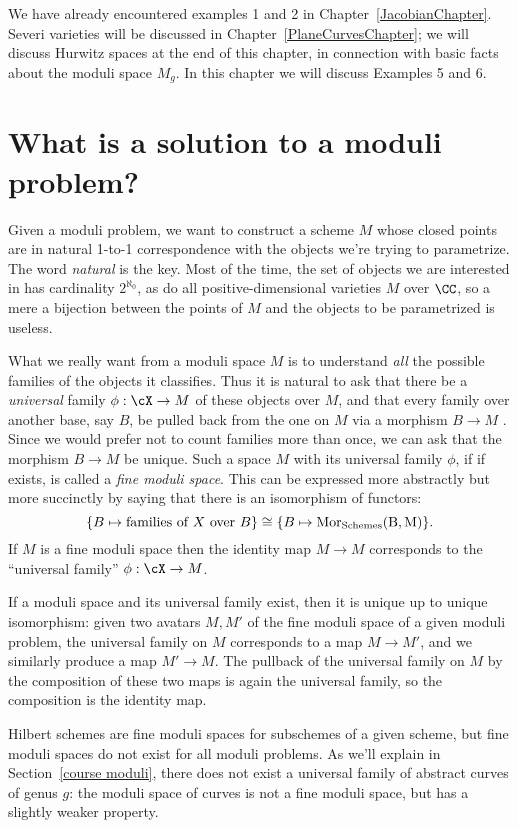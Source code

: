 We have already encountered examples 1 and 2 in Chapter~\ref{JacobianChapter}. Severi varieties will be discussed in Chapter~\ref{PlaneCurvesChapter}; we will discuss Hurwitz spaces at the end of this chapter, in connection with basic facts about the moduli space $M_g$. In this chapter we will discuss Examples 5 and 6.



\section{What is a solution to a moduli problem?}

Given a moduli problem, we want to construct a scheme $M$ whose closed points are in natural  1-to-1 correspondence with the objects we're trying to parametrize. The word \emph{natural} is the key. Most of the time, the set of objects we are interested in has cardinality $2^{\aleph_0}$, as do all positive-dimensional varieties $M$ over $\CC$, so a mere a bijection between the points of $M$ and the objects to be parametrized is useless.

What we really want from a moduli space $M$ is to understand \emph{all} the possible families of the objects it classifies. Thus it is natural to ask that there be a \emph{universal} family $\phi: \cX\to M$ of these objects over $M$,
and that every family over another base, say $B$,  be pulled back from the one on $M$ via a morphism $B\to M$ . Since we would prefer not to count families more than once, we can ask that the 
morphism $B\to M$ be unique. Such a space $M$ with its universal family $\phi$, if if exists, is called a \emph{fine moduli space}. This can be expressed more abstractly but more succinctly by saying that there is an isomorphism of functors:
$$
\{ B \mapsto \text{families of } X \text{ over } B \} \cong \{ B\mapsto \rm{Mor}_{\rm Schemes}(B, M) \}.
$$
If $M$ is a fine moduli space then the identity map $M\to M$ corresponds to the ``universal family'' $\phi: \cX \to M$. 

If a moduli space and its universal family exist, then it is unique up to unique isomorphism: given two avatars $M,M'$ of the fine moduli space of a given moduli problem,
the universal family on $M$ corresponds to a map $M\to M'$, and we similarly produce a map $M'\to M$. The pullback of the universal family on $M$ by the composition of these two maps is again the universal family, so the composition is the identity map.

Hilbert schemes are fine moduli spaces for subschemes of a given scheme, but 
fine moduli spaces do not exist for all moduli problems. As we'll explain in Section~\ref{course moduli}, there does not exist a universal family of abstract curves of genus $g$: the moduli space of curves is
not a fine moduli space, but has a slightly weaker property.

